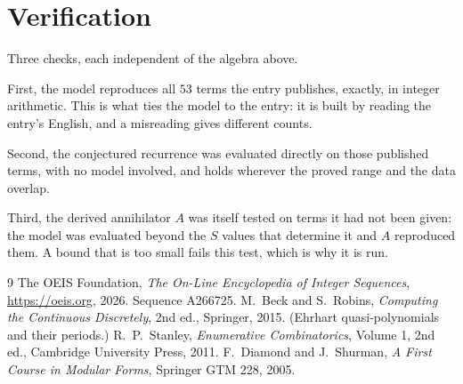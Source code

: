 \documentclass[11pt,a4paper]{article}
\theoremstyle{plain}
\theoremstyle{definition}
\begin{document}
\section{Verification}

Three checks, each independent of the algebra above.

First, the model reproduces all $53$ terms the entry publishes, exactly, in integer
arithmetic. This is what ties the model to the entry: it is built by reading the entry's
English, and a misreading gives different counts.

Second, the conjectured recurrence was evaluated directly on those published terms, with no
model involved, and holds wherever the proved range and the data overlap.

Third, the derived annihilator $A$ was itself tested on terms it had not been given: the model
was evaluated beyond the $S$ values that determine it and $A$ reproduced them. A bound that is
too small fails this test, which is why it is run.

\begin{thebibliography}{9}
 The OEIS Foundation, \emph{The On-Line Encyclopedia of Integer
Sequences}, \url{https://oeis.org}, 2026. Sequence A266725.
 M.~Beck and S.~Robins, \emph{Computing the Continuous Discretely},
2nd ed., Springer, 2015. (Ehrhart quasi-polynomials and their periods.)
 R.~P.~Stanley, \emph{Enumerative Combinatorics}, Volume 1, 2nd ed.,
Cambridge University Press, 2011.
 F.~Diamond and J.~Shurman, \emph{A First Course in Modular Forms},
Springer GTM 228, 2005.
\end{thebibliography}
\end{document}

